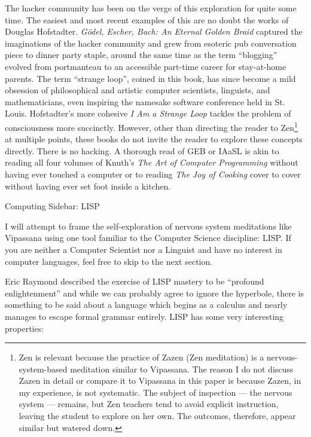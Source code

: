 \documentclass{article}
\begin{document}
The hacker community has been on the verge of this exploration for quite some time. The easiest and most recent examples of this are no doubt the works of Douglas Hofstadter. \textit{Gödel, Escher, Bach: An Eternal Golden Braid} captured the imaginations of the hacker community and grew from esoteric pub conversation piece to dinner party staple, around the same time as the term ``blogging'' evolved from portmanteau to an accessible part-time career for stay-at-home parents. The term ``strange loop'', coined in this book, has since become a mild obsession of philosophical and artistic computer scientists, linguists, and mathematicians, even inspiring the namesake software conference held in St. Louis. Hofstadter's more cohesive \textit{I Am a Strange Loop} tackles the problem of consciousness more succinctly. However, other than directing the reader to Zen\footnote{Zen is relevant because the practice of Zazen (Zen meditation) is a nervous-system-based meditation similar to Vipassana. The reason I do not discuss Zazen in detail or compare it to Vipassana in this paper is because Zazen, in my experience, is not systematic. The subject of inspection — the nervous system — remains, but Zen teachers tend to avoid explicit instruction, leaving the student to explore on her own. The outcomes, therefore, appear similar but watered down.} at multiple points, these books do not invite the reader to explore these concepts directly. There is no hacking. A thorough read of GEB or IAaSL is akin to reading all four volumes of Knuth's \textit{The Art of Computer Programming} \cite{taocp} without having ever touched a computer or to reading \textit{The Joy of Cooking} \cite{joyofcooking} cover to cover without having ever set foot inside a kitchen.

\pagebreak

\begin{center}
  \Huge{Computing Sidebar: LISP}
\end{center}

I will attempt to frame the self-exploration of nervous system meditations like Vipassana using one tool familiar to the Computer Science discipline: LISP. If you are neither a Computer Scientist nor a Linguist and have no interest in computer languages, feel free to skip to the next section.

Eric Raymond described the exercise of LISP mastery to be ``profound enlightenment'' \cite{hackerhowto} and while we can probably agree to ignore the hyperbole, there is something to be said about a language which begins as a calculus and nearly manages to escape formal grammar entirely. LISP has some very interesting properties:
\end{document}
